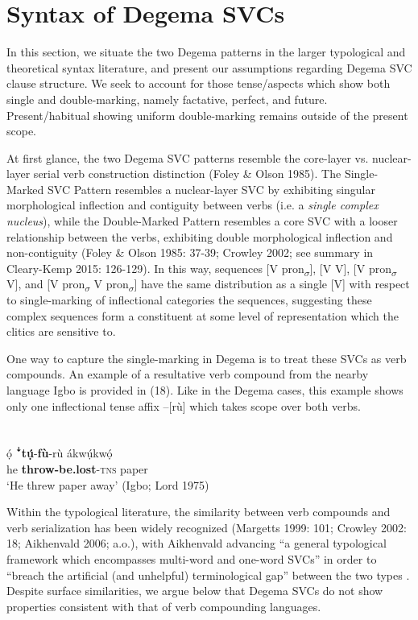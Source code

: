 \documentclass[output=paper]{langsci/langscibook}
\begin{document}
\chapter{Syntax of Degema SVCs}

In this section, we situate the two Degema patterns in the larger typological and theoretical syntax literature, and present our assumptions regarding Degema SVC clause structure. We seek to account for those tense/aspects which show both single and double-marking, namely factative, perfect, and future. Present/habitual showing uniform double-marking remains outside of the present scope. 

At first glance, the two Degema SVC patterns resemble the core-layer vs. nuclear-layer serial verb construction distinction (Foley \& Olson 1985). The Single-Marked SVC Pattern resembles a nuclear-layer SVC by exhibiting singular morphological inflection and contiguity between verbs (i.e. a \textit{single complex nucleus}), while the Double-Marked Pattern resembles a core SVC with a looser relationship between the verbs, exhibiting double morphological inflection and non-contiguity (Foley \& Olson 1985: 37-39; Crowley 2002; see summary in Cleary-Kemp 2015: 126-129). In this way, sequences [V pron\textsubscript{$\sigma $}], [V V], [V pron\textsubscript{$\sigma $} V], and [V pron\textsubscript{$\sigma $} V pron\textsubscript{$\sigma $}] have the same distribution as a single [V] with respect to single-marking of inflectional categories the sequences, suggesting these complex sequences form a constituent at some level of representation which the clitics are sensitive to. 

One way to capture the single-marking in Degema is to treat these SVCs as verb compounds. An example of a resultative verb compound from the nearby language Igbo is provided in (18). Like in the Degema cases, this example shows only one inflectional tense affix –[rù] which takes scope over both verbs.

\chapter[]{}
\label{bkm:Ref436576739}\gll ọ́    ꜜ\textbf{tụ́}{}-\textbf{fù}{}-rù      ákwụ́kwọ́\\
     he  \textbf{throw-be.lost}{}-\textsc{tns}  paper\\
\glt ‘He threw paper away’ (Igbo; Lord 1975)
\z

Within the typological literature, the similarity between verb compounds and verb serialization has been widely recognized (Margetts 1999: 101; Crowley 2002: 18; Aikhenvald 2006; a.o.), with Aikhenvald advancing “a general typological framework which encompasses multi-word and one-word SVCs” in order to “breach the artificial (and unhelpful) terminological gap” between the two types \citep[38]{Aikhenvald2006}. Despite surface similarities, we argue below that Degema SVCs do not show properties consistent with that of verb compounding languages. 
\end{document}

